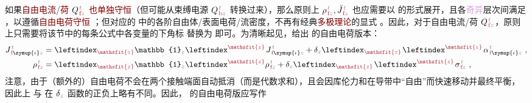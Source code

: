 如果\textcolor{Maroon}{自由电流}/\textcolor{Maroon}{荷} ${Q}^{\;\!\mathcolor{gray}{t}}_{\;\!\textcolor{Maroon}{\text{f}}\mathcolor{gray}{z}}$ \textcolor{Maroon}{也单独守恒}（但可能从束缚电源 ${Q}^{\;\!\mathcolor{gray}{t}}_{\;\!\textcolor{Maroon}{\text{b}}\mathcolor{gray}{z}}$ 转换过来），那么原则上 ${\rho}^{\;\!\mathcolor{gray}{t}}_{\;\!\textcolor{Maroon}{\text{f}}\mathcolor{gray}{z}},\bar{J}^{\;\!\mathcolor{gray}{t}}_{\;\!\textcolor{Maroon}{\text{f}}\mathcolor{gray}{z}}$ 也应需要以  的形式展开，且各\textcolor{Plum}{奇异}层次间满足 ，以遵循\textcolor{Maroon}{自由电荷守恒} ；但对应的  中的各阶自由体/表面电荷/流密度，不再有经典\textcolor{Maroon}{多极理论}的显式 。因此，对于自由电流/荷 ${Q}^{\;\!\mathcolor{gray}{t}}_{\;\!\textcolor{Maroon}{\text{f}}\mathcolor{gray}{z}}$，原则上只需要将该节中的每条公式中各变量的下角标 \textcolor{Maroon}{} 替换为 \textcolor{Maroon}{} 即可。为清晰起见，给出  的自由电荷版本：
\begin{subequations} \label{eq:e-f-01}
	\abovedisplayskip=5pt
\begin{align}
	J^{\;\!\mathcolor{gray}{t}}_{\;\!\textcolor{Maroon}{\text{f}} \symup{\iota}\mathcolor{gray}{z}} &= \leftindex_{\textcolor{Maroon}{\mathsfit{z}}} {\mathbb{1}}_{\mathcolor{gray}{z}} \leftindex^{\textcolor{Maroon}{\mathsfit{z}}} \;\! J^{\;\!\mathcolor{gray}{t}}_{\;\!\textcolor{Maroon}{\text{f}} \symup{\iota}\mathcolor{gray}{z}} + \delta_{\mathcolor{gray}{z}} \leftindex_{\textcolor{Maroon}{\mathsfit{z}}} \;\! \leftindex^{\textcolor{Maroon}{\mathsfit{z}}} \;\!
	{\alpha}^{\;\!\mathcolor{gray}{t}}_{\;\!\textcolor{Maroon}{\text{f}} \symup{\iota}\mathcolor{gray}{z}} ~, \label{eq:j-f-01} \\
	{\rho}^{\;\!\mathcolor{gray}{t}}_{\;\!\textcolor{Maroon}{\text{f}}\mathcolor{gray}{z}} &= \leftindex_{\textcolor{Maroon}{\mathsfit{z}}} {\mathbb{1}}_{\mathcolor{gray}{z}} \leftindex^{\textcolor{Maroon}{\mathsfit{z}}} {\rho}^{\;\!\mathcolor{gray}{t}}_{\;\!\textcolor{Maroon}{\text{f}}\mathcolor{gray}{z}} + \delta_{\mathcolor{gray}{z}} \leftindex_{\textcolor{Maroon}{\mathsfit{z}}} \;\! \leftindex^{\textcolor{Maroon}{\mathsfit{z}}} \;\! {\sigma}^{\;\!\mathcolor{gray}{t}}_{\;\!\textcolor{Maroon}{\text{f}} \mathcolor{gray}{z}} ~, \label{eq:p-f-01}
\end{align}
\end{subequations}
注意，由于（额外的）自由电荷不会在两个接触端面自动抵消（而是代数求和），且会因库伦力和在导带中“自由”而快速移动并最终平衡，因此上  与  在 $\delta_{\mathcolor{gray}{z}}$ 函数的正负上略有不同。因此，  的自由电荷版应写作
